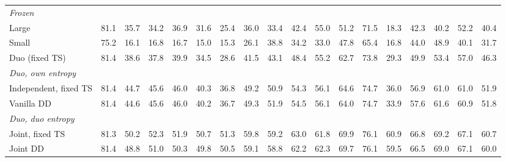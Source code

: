 \begin{table}[t]
{\begin{tabular}{l|c|ccc|cccc|cccc|cccc|c}
        \midrule
        \multicolumn{18}{l}{\textit{Frozen}} \\
        \quad Large & 81.1 & 35.7 & 34.2 & 36.9 & 31.6 & 25.4 & 36.0 & 33.4 & 42.4 & 55.0 & 51.2 & 71.5 & 18.3 & 42.3 & 40.2 & 52.2 & 40.4 \\
        \quad Small & 75.2 & 16.1 & 16.8 & 16.7 & 15.0 & 15.3 & 26.1 & 38.8 & 34.2 & 33.0 & 47.8 & 65.4 & 16.8 & 44.0 & 48.9 & 40.1 & 31.7 \\
        \quad Duo (fixed TS) & 81.4 & 38.6 & 37.8 & 39.9 & 34.5 & 28.6 & 41.5 & 43.1 & 48.4 & 55.2 & 62.7 & 73.8 & 29.3 & 49.9 & 53.4 & 57.0 & 46.3 \\
        \midrule
        \multicolumn{18}{l}{\textit{Duo, own entropy}} \\
        \quad Independent, fixed TS & 81.4 & 44.7 & 45.6 & 46.0 & 40.3 & 36.8 & 49.2 & 50.9 & 54.3 & 56.1 & 64.6 & 74.7 & 36.0 & 56.9 & 61.0 & 61.0 & 51.9 \\
        \quad Vanilla DD & 81.4 & 44.6 & 45.6 & 46.0 & 40.2 & 36.7 & 49.3 & 51.9 & 54.5 & 56.1 & 64.0 & 74.7 & 33.9 & 57.6 & 61.6 & 60.9 & 51.8 \\
        \midrule
        \multicolumn{18}{l}{\textit{Duo, duo entropy}} \\
        \quad Joint, fixed TS & 81.3 & 50.2 & 52.3 & 51.9 & 50.7 & 51.3 & 59.8 & 59.2 & 63.0 & 61.8 & 69.9 & 76.1 & 60.9 & 66.8 & 69.2 & 67.1 & 60.7 \\
        \quad Joint DD & 81.4 & 48.8 & 51.0 & 50.3 & 49.8 & 50.5 & 59.1 & 58.8 & 62.2 & 62.3 & 69.7 & 76.1 & 59.5 & 66.5 & 69.0 & 67.1 & 60.0 \\
        \bottomrule
    \end{tabular}%
    }
\end{table}
